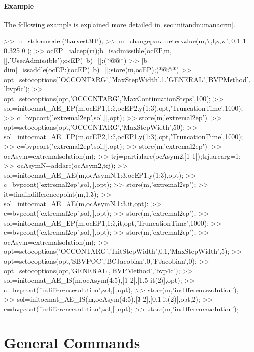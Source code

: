 \paragraph{Example}
The following example is explained more detailed in \cref{sec:initandnumanacrm}.
\begin{matlab}
>> m=stdocmodel('harvest3D');
>> m=changeparametervalue(m,'r,l,s,w',[0.1 1 0.325 0]);
>> ocEP=calcep(m);b=isadmissible(ocEP,m,[],'UserAdmissible');ocEP(~b)=[];(*@@*)
>> [b dim]=issaddle(ocEP{:});ocEP(~b)=[];store(m,ocEP);(*@@*)
>> opt=setocoptions('OCCONTARG','MaxStepWidth',1,'GENERAL','BVPMethod','bvp6c');
>> opt=setocoptions(opt,'OCCONTARG','MaxContinuationSteps',100);
>> sol=initocmat_AE_EP(m,ocEP{1},1:3,ocEP{2}.y(1:3),opt,'TruncationTime',1000);
>> c=bvpcont('extremal2ep',sol,[],opt);
>> store(m,'extremal2ep');
>> opt=setocoptions(opt,'OCCONTARG','MaxStepWidth',50);
>> sol=initocmat_AE_EP(m,ocEP{2},1:3,ocEP{1}.y(1:3),opt,'TruncationTime',1000);
>> c=bvpcont('extremal2ep',sol,[],opt);
>> store(m,'extremal2ep');
>> ocAsym=extremalsolution(m);
>> trj=partialarc(ocAsym{2},[1 1]);trj.arcarg=1;
>> ocAsymN=addarc(ocAsym{2},trj);
>> sol=initocmat_AE_AE(m,ocAsymN,1:3,ocEP{1}.y(1:3),opt);
>> c=bvpcont('extremal2ep',sol,[],opt);
>> store(m,'extremal2ep');
>> it=findindifferencepoint(m,1,3);
>> sol=initocmat_AE_AE(m,ocAsymN,1:3,it,opt);
>> c=bvpcont('extremal2ep',sol,[],opt);
>> store(m,'extremal2ep');
>> sol=initocmat_AE_EP(m,ocEP{1},1:3,it,opt,'TruncationTime',1000);
>> c=bvpcont('extremal2ep',sol,[],opt);
>> store(m,'extremal2ep');
>> ocAsym=extremalsolution(m);
>> opt=setocoptions('OCCONTARG','InitStepWidth',0.1,'MaxStepWidth',5);
>> opt=setocoptions(opt,'SBVPOC','BCJacobian',0,'FJacobian',0);
>> opt=setocoptions(opt,'GENERAL','BVPMethod','bvp4c');
>> sol=initocmat_AE_IS(m,ocAsym(4:5),[1 2],[1.5 it(2)],opt);
>> c=bvpcont('indifferencesolution',sol,[],opt);
>> store(m,'indifferencesolution');
>> sol=initocmat_AE_IS(m,ocAsym(4:5),[3 2],[0.1 it(2)],opt,2);
>> c=bvpcont('indifferencesolution',sol,[],opt);
>> store(m,'indifferencesolution');
\end{matlab}
\section{General Commands}
